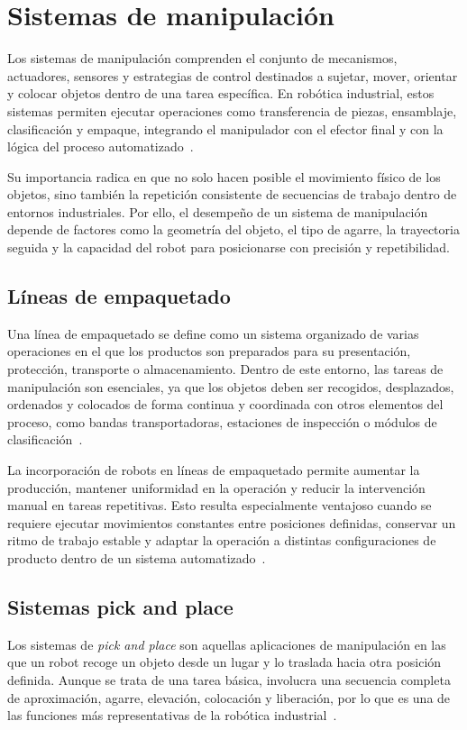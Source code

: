 \section{Sistemas de manipulación}
Los sistemas de manipulación comprenden el conjunto de mecanismos, actuadores, sensores y estrategias de control destinados a sujetar, mover, orientar y colocar objetos dentro de una tarea específica. En robótica industrial, estos sistemas permiten ejecutar operaciones como transferencia de piezas, ensamblaje, clasificación y empaque, integrando el manipulador con el efector final y con la lógica del proceso automatizado~\cite{siciliano2010robotics,correll2022autonomous}.

Su importancia radica en que no solo hacen posible el movimiento físico de los objetos, sino también la repetición consistente de secuencias de trabajo dentro de entornos industriales. Por ello, el desempeño de un sistema de manipulación depende de factores como la geometría del objeto, el tipo de agarre, la trayectoria seguida y la capacidad del robot para posicionarse con precisión y repetibilidad.

\subsection{Líneas de empaquetado}
Una línea de empaquetado se define como un sistema organizado de varias operaciones en el que los productos son preparados para su presentación, protección, transporte o almacenamiento. Dentro de este entorno, las tareas de manipulación son esenciales, ya que los objetos deben ser recogidos, desplazados, ordenados y colocados de forma continua y coordinada con otros elementos del proceso, como bandas transportadoras, estaciones de inspección o módulos de clasificación~\cite{siciliano2010robotics}.

La incorporación de robots en líneas de empaquetado permite aumentar la producción, mantener uniformidad en la operación y reducir la intervención manual en tareas repetitivas. Esto resulta especialmente ventajoso cuando se requiere ejecutar movimientos constantes entre posiciones definidas, conservar un ritmo de trabajo estable y adaptar la operación a distintas configuraciones de producto dentro de un sistema automatizado~\cite{siciliano2010robotics}.

\subsection{Sistemas pick and place}
Los sistemas de \textit{pick and place} son aquellas aplicaciones de manipulación en las que un robot recoge un objeto desde un lugar y lo traslada hacia otra posición definida. Aunque se trata de una tarea básica, involucra una secuencia completa de aproximación, agarre, elevación, colocación y liberación, por lo que es una de las funciones más representativas de la robótica industrial~\cite{correll2022autonomous}.

